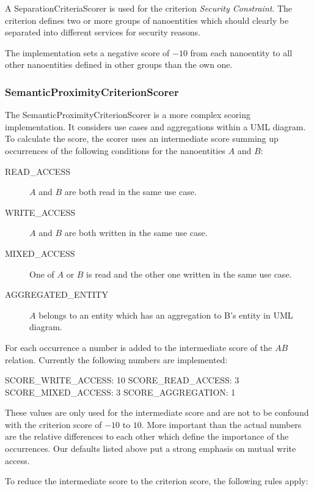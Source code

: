 A SeparationCriteriaScorer is used for the criterion \textit{Security Constraint}. The criterion defines two or more groups of nanoentities which should clearly be separated into different services for security reasons. 

The implementation sets a negative score of $-10$ from each nanoentity to all other nanoentities defined in other groups than the own one. 

\subsubsection{SemanticProximityCriterionScorer}

The SemanticProximityCriterionScorer is a more complex scoring implementation. It considers use cases and aggregations within a UML diagram. To calculate the score, the scorer uses an intermediate score summing up occurrences of the following conditions for the nanoentities $A$ and $B$:

\begin{description}
	\item [READ\_ACCESS] $A$ and $B$ are both read in the same use case.
	\item [WRITE\_ACCESS] $A$ and $B$ are both written in the same use case.
	\item [MIXED\_ACCESS] One of $A$ or $B$ is read and the other one written in the same use case.
	\item [AGGREGATED\_ENTITY] $A$ belongs to an entity which has an aggregation to B's entity in UML diagram. 
\end{description}

For each occurrence a number is added to the intermediate score of the $AB$ relation. Currently the following numbers are implemented:

SCORE\_WRITE\_ACCESS: 10 \newline
SCORE\_READ\_ACCESS: 3  \newline
SCORE\_MIXED\_ACCESS: 3 \newline 
SCORE\_AGGREGATION: 1 \newline 

These values are only used for the intermediate score and are not to be confound with the criterion score of $-10$ to $10$. More important than the actual numbers are the relative differences to each other which define the importance of the occurrences. Our defaults listed above put a strong emphasis on mutual write access. 

To reduce the intermediate score to the criterion score, the following rules apply:

